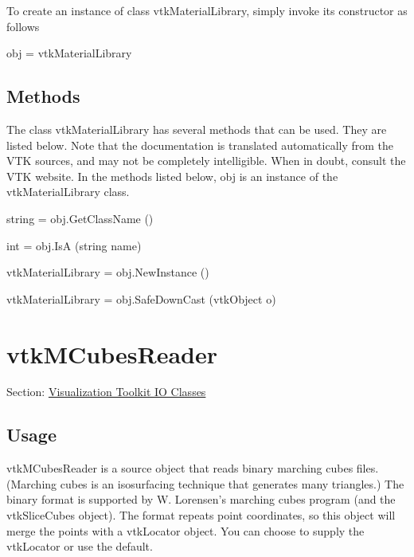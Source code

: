 To create an instance of class vtk\-Material\-Library, simply invoke its constructor as follows \begin{DoxyVerb}  obj = vtkMaterialLibrary
\end{DoxyVerb}
 \hypertarget{vtkwidgets_vtkxyplotwidget_Methods}{}\subsection{Methods}\label{vtkwidgets_vtkxyplotwidget_Methods}
The class vtk\-Material\-Library has several methods that can be used. They are listed below. Note that the documentation is translated automatically from the V\-T\-K sources, and may not be completely intelligible. When in doubt, consult the V\-T\-K website. In the methods listed below, {\ttfamily obj} is an instance of the vtk\-Material\-Library class. 
\begin{DoxyItemize}
\item {\ttfamily string = obj.\-Get\-Class\-Name ()}  
\item {\ttfamily int = obj.\-Is\-A (string name)}  
\item {\ttfamily vtk\-Material\-Library = obj.\-New\-Instance ()}  
\item {\ttfamily vtk\-Material\-Library = obj.\-Safe\-Down\-Cast (vtk\-Object o)}  
\end{DoxyItemize}\hypertarget{vtkio_vtkmcubesreader}{}\section{vtk\-M\-Cubes\-Reader}\label{vtkio_vtkmcubesreader}
Section\-: \hyperlink{sec_vtkio}{Visualization Toolkit I\-O Classes} \hypertarget{vtkwidgets_vtkxyplotwidget_Usage}{}\subsection{Usage}\label{vtkwidgets_vtkxyplotwidget_Usage}
vtk\-M\-Cubes\-Reader is a source object that reads binary marching cubes files. (Marching cubes is an isosurfacing technique that generates many triangles.) The binary format is supported by W. Lorensen's marching cubes program (and the vtk\-Slice\-Cubes object). The format repeats point coordinates, so this object will merge the points with a vtk\-Locator object. You can choose to supply the vtk\-Locator or use the default.

